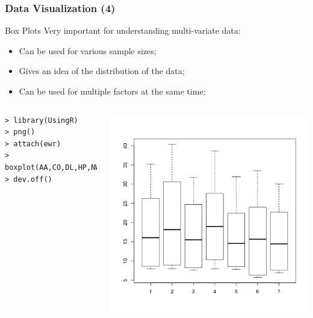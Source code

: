 \documentclass[10pt]{beamer}
\begin{document}
\begin{frame}
  \frametitle{Data Visualization (4)}
  \begin{block}{Box Plots}
    Very important for understanding multi-variate data:
    \begin{itemize}
      \item Can be used for various sample sizes;
      \item Gives an idea of the distribution of the data;
      \item Can be used for multiple factors at the same time;
    \end{itemize}
  \end{block}
  \begin{columns}[c]
\small{
\begin{verbatim}
> library(UsingR)
> png()
> attach(ewr)
> boxplot(AA,CO,DL,HP,NW,TW,US)
> dev.off()
\end{verbatim}}
    \includegraphics[width=1\textwidth]{img/boxplot}
  \end{columns}
\end{frame}
\end{document}
